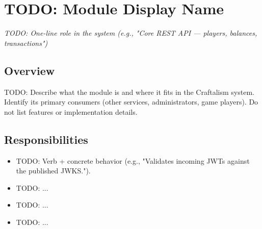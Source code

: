 %
%


\chapter{TODO: Module Display Name}
\label{ch:TODO-module-id}


\textcolor{CraftGray}{\textit{TODO: One-line role in the system (e.g., "Core REST API — players, balances, transactions")}}

\bigskip

\section{Overview}
%
%
TODO: Describe what the module is and where it fits in the Craftalism system.
Identify its primary consumers (other services, administrators, game players).
Do not list features or implementation details.

\section{Responsibilities}
%
%
\begin{itemize}
  \item TODO: Verb + concrete behavior (e.g., "Validates incoming JWTs against the published JWKS.").
  \item TODO: ...
  \item TODO: ...
  \item TODO: ...
\end{itemize}

